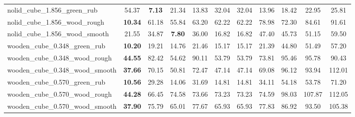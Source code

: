 \begin{table}[H]
{\begin{tabular}{l cccccccccc}
        nolid\_cube\_1.856\_green\_rub & 54.37 & \textbf{7.13} & 21.34 & 13.83 & 32.04 & 32.04 & 13.96 & 18.42 & 22.95 & 25.81 \\
        nolid\_cube\_1.856\_wood\_rough & \textbf{10.34} & 61.18 & 55.84 & 63.20 & 62.22 & 62.22 & 78.98 & 72.30 & 84.61 & 91.61 \\
        nolid\_cube\_1.856\_wood\_smooth & 21.55 & 34.87 & \textbf{7.80} & 36.00 & 16.82 & 16.82 & 47.40 & 45.73 & 51.15 & 59.50 \\
        wooden\_cube\_0.348\_green\_rub & \textbf{10.20} & 19.21 & 14.76 & 21.46 & 15.17 & 15.17 & 21.39 & 44.80 & 51.49 & 57.20 \\
        wooden\_cube\_0.348\_wood\_rough & \textbf{44.55} & 82.42 & 54.62 & 90.11 & 53.79 & 53.79 & 73.81 & 95.46 & 95.78 & 90.43 \\
        wooden\_cube\_0.348\_wood\_smooth & \textbf{37.66} & 70.15 & 50.81 & 72.47 & 47.14 & 47.14 & 69.08 & 96.12 & 93.94 & 112.01 \\
        wooden\_cube\_0.570\_green\_rub & \textbf{10.56} & 29.28 & 14.06 & 31.69 & 14.81 & 14.81 & 34.11 & 54.18 & 53.78 & 71.20 \\
        wooden\_cube\_0.570\_wood\_rough & \textbf{44.28} & 66.45 & 74.58 & 73.66 & 73.23 & 73.23 & 74.59 & 98.03 & 107.87 & 112.05 \\
        wooden\_cube\_0.570\_wood\_smooth & \textbf{37.90} & 75.79 & 65.01 & 77.67 & 65.93 & 65.93 & 77.83 & 86.92 & 93.50 & 105.38 \\
        \bottomrule
    \end{tabular}
    }
\end{table}



\vspace{1cm}

\clearpage

